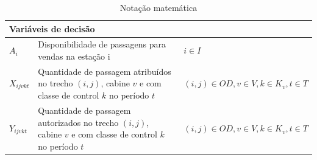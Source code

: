 \begin{table}[h]
\begin{tabular}{p{2cm} p{9.5cm} p{3.2cm}}
		\multicolumn{3}{l}{\textbf{Variáveis de decisão}}                                                                                                                              \\ \midrule
		$A_{i}$            & Disponibilidade de passagens para vendas na estação i                                                       & $i \in I$                                   \\
		$X_{ijvkt}$        & Quantidade de passagem atribuídos no trecho $(i,j)$, cabine $v$ e com classe de control $k$ no período $t$  & $(i,j) \in OD, v \in V, k \in K_v, t \in T$ \\
		$Y_{ijvkt}$        & Quantidade de passagem autorizados no trecho $(i,j)$, cabine $v$ e com classe de control $k$ no período $t$ & $(i,j) \in OD, v \in V, k \in K_v, t \in T$ \\ \bottomrule
	\end{tabular}
	\caption{Notação matemática}
	\label{tab: m1_definicao}
\end{table}

